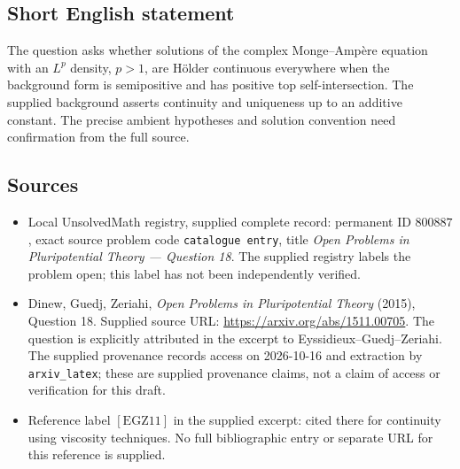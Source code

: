 \documentclass[11pt]{article}
\begin{document}
\subsection{Short English statement}
The question asks whether solutions of the complex Monge--Amp\`ere equation with an \(L^p\) density, \(p>1\), are H\"older continuous everywhere when the background form is semipositive and has positive top self-intersection. The supplied background asserts continuity and uniqueness up to an additive constant. The precise ambient hypotheses and solution convention need confirmation from the full source.
\subsection{Sources}
\begin{itemize}
\item Local UnsolvedMath registry, supplied complete record: permanent ID \(800887\), exact source problem code \texttt{catalogue entry}, title \emph{Open Problems in Pluripotential Theory --- Question 18}. The supplied registry labels the problem open; this label has not been independently verified.
\item Dinew, Guedj, Zeriahi, \emph{Open Problems in Pluripotential Theory} (2015), Question 18. Supplied source URL: \url{https://arxiv.org/abs/1511.00705}. The question is explicitly attributed in the excerpt to Eyssidieux--Guedj--Zeriahi. The supplied provenance records access on 2026-10-16 and extraction by \texttt{arxiv\_latex}; these are supplied provenance claims, not a claim of access or verification for this draft.
\item Reference label \([\mathrm{EGZ11}]\) in the supplied excerpt: cited there for continuity using viscosity techniques. No full bibliographic entry or separate URL for this reference is supplied.
\end{itemize}
\end{document}
